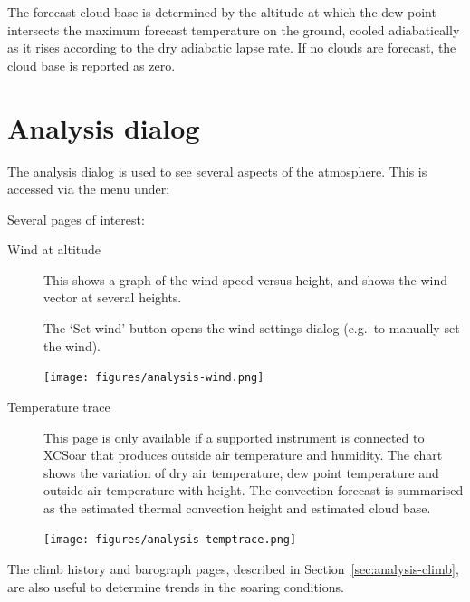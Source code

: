 %

The forecast cloud base is determined by the altitude at which the dew
point intersects the maximum forecast temperature on the ground,
cooled adiabatically as it rises according to the dry adiabatic lapse
rate.  If no clouds are forecast, the cloud base is reported as zero.


\section{Analysis dialog}

The analysis dialog is used to see several aspects of the atmosphere.
This is accessed via the menu under:
\begin{quote}
\blink{}
\end{quote}

Several pages of interest:
\begin{description}

\item[Wind at altitude]
  This shows a graph of the wind speed versus height, and shows the
  wind vector at several heights.

The `Set wind' button opens the wind settings dialog (e.g.\ to
manually set the wind).

\begin{center}
\texttt{[image: figures/analysis-wind.png]}
\end{center}

\item[Temperature trace]
  This page is only available if a supported instrument is connected
  to XCSoar that produces outside air temperature and humidity.  The
  chart shows the variation of dry air temperature, dew point
  temperature and outside air temperature with height.  The convection
  forecast is summarised as the estimated thermal convection height
  and estimated cloud base.

\begin{center}
\texttt{[image: figures/analysis-temptrace.png]}
\end{center}

\end{description}
The climb history and barograph pages, described in
Section~\ref{sec:analysis-climb}, are also useful to determine
trends in the soaring conditions.


